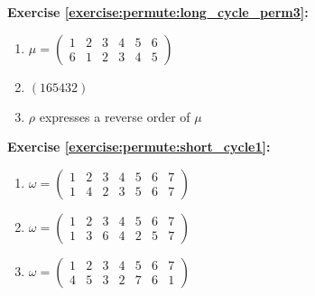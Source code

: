 \noindent\textbf{Exercise \ref{exercise:permute:long_cycle_perm3}:}
\begin{enumerate}[{a.}]
\item
$\mu = \begin{pmatrix}
1 & 2 & 3 & 4 & 5 & 6\\
6 & 1 & 2 & 3 & 4 & 5
\end{pmatrix}$

\item
$(165432)$\\

\item
$\rho$ expresses a reverse order of $\mu$
\end{enumerate}

\noindent\textbf{Exercise \ref{exercise:permute:short_cycle1}:}
\begin{multicols}{2}
\begin{enumerate}[{a.}]
\item
$\omega = \begin{pmatrix}
1 & 2 & 3 & 4 & 5 & 6 & 7\\
1 & 4 & 2 & 3 & 5 & 6 & 7
\end{pmatrix}$

\item
$\omega = \begin{pmatrix}
1 & 2 & 3 & 4 & 5 & 6 & 7\\
1 & 3 & 6 & 4 & 2 & 5 & 7
\end{pmatrix}$

\item
$\omega = \begin{pmatrix}
1 & 2 & 3 & 4 & 5 & 6 & 7\\
4 & 5 & 3 & 2 & 7 & 6 & 1
\end{pmatrix}$
\end{enumerate}
\end{multicols}

